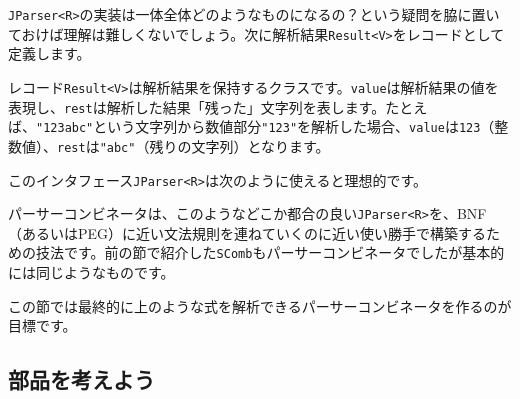 \texttt{JParser\textless{}R\textgreater{}}の実装は一体全体どのようなものになるの？という疑問を脇に置いておけば理解は難しくないでしょう。次に解析結果\texttt{Result\textless{}V\textgreater{}}をレコードとして定義します。

\begin{Shaded}
\begin{Highlighting}[]
\end{Highlighting}
\end{Shaded}

レコード\texttt{Result\textless{}V\textgreater{}}は解析結果を保持するクラスです。\texttt{value}は解析結果の値を表現し、\texttt{rest}は解析した結果「残った」文字列を表します。たとえば、\texttt{"123abc"}という文字列から数値部分\texttt{"123"}を解析した場合、\texttt{value}は\texttt{123}（整数値）、\texttt{rest}は\texttt{"abc"}（残りの文字列）となります。

このインタフェース\texttt{JParser\textless{}R\textgreater{}}は次のように使えると理想的です。

\begin{Shaded}
\begin{Highlighting}[]
\NormalTok{\textless{}}\NormalTok{(}\NormalTok{);}
\NormalTok{();}
\end{Highlighting}
\end{Shaded}

パーサーコンビネータは、このようなどこか都合の良い\texttt{JParser\textless{}R\textgreater{}}を、BNF（あるいはPEG）に近い文法規則を連ねていくのに近い使い勝手で構築するための技法です。前の節で紹介した\texttt{SComb}もパーサーコンビネータでしたが基本的には同じようなものです。

この節では最終的に上のような式を解析できるパーサーコンビネータを作るのが目標です。

\hypertarget{chapter6-ux90e8ux54c1ux3092ux8003ux3048ux3088ux3046}{%
\subsection{部品を考えよう}\label{chapter6-ux90e8ux54c1ux3092ux8003ux3048ux3088ux3046}}

